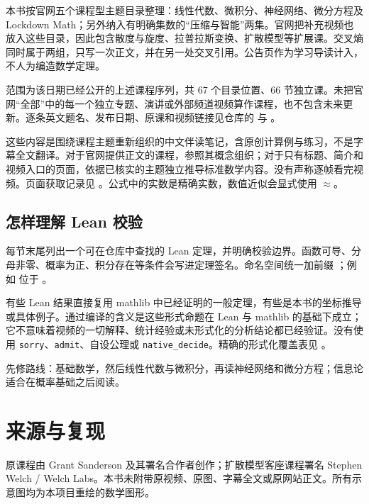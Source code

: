 \documentclass[UTF8,11pt,oneside,fontset=fandol]{ctexbook}
\newcommand{\chapterreview}[1]{\par\noindent\begin{minipage}{\linewidth}\end{minipage}\par}
\begin{document}
本书按官网五个课程型主题目录整理：线性代数、微积分、神经网络、微分方程及 Lockdown Math；另外纳入有明确集数的“压缩与智能”两集。官网把补充视频也放入这些目录，因此包含散度与旋度、拉普拉斯变换、扩散模型等扩展课。交叉熵同时属于两组，只写一次正文，并在另一处交叉引用。公告页作为学习导读计入，不人为编造数学定理。

范围为该日期已经公开的上述课程序列，共 67 个目录位置、66 节独立课。未把官网“全部”中的每一个独立专题、演讲或外部频道视频算作课程，也不包含未来更新。逐条英文题名、发布日期、原课和视频链接见仓库的  与 。

这些内容是围绕课程主题重新组织的中文伴读笔记，含原创计算例与练习，不是字幕全文翻译。对于官网提供正文的课程，参照其概念组织；对于只有标题、简介和视频入口的页面，依据已核实的主题独立推导标准数学内容。没有声称逐帧看完视频。页面获取记录见 。公式中的实数是精确实数，数值近似会显式使用 $\approx$。

\section*{怎样理解 Lean 校验}
每节末尾列出一个可在仓库中查找的 Lean 定理，并明确校验边界。函数可导、分母非零、概率为正、积分存在等条件会写进定理签名。命名空间统一加前缀 ；例如  位于 。

有些 Lean 结果直接复用 mathlib 中已经证明的一般定理，有些是本书的坐标推导或具体例子。通过编译的含义是这些形式命题在 Lean 与 mathlib 的基础下成立；它不意味着视频的一切解释、统计经验或未形式化的分析结论都已经验证。没有使用 \texttt{sorry}、\texttt{admit}、自设公理或 \texttt{native\_decide}。精确的形式化覆盖表见 。

先修路线：基础数学，然后线性代数与微积分，再读神经网络和微分方程；信息论适合在概率基础之后阅读。
\endgroup
\tableofcontents
\mainmatter

\chapterreview{linear-algebra}

\chapterreview{calculus}

\chapterreview{neural-networks}

\chapterreview{differential-equations}

\chapterreview{lockdown-math}

\chapterreview{compression}
\backmatter
\chapter{来源与复现}
原课程由 Grant Sanderson 及其署名合作者创作；扩散模型客座课程署名 Stephen Welch / Welch Labs。本书未附带原视频、原图、字幕全文或原网站正文。所有示意图均为本项目重绘的数学图形。
\end{document}
